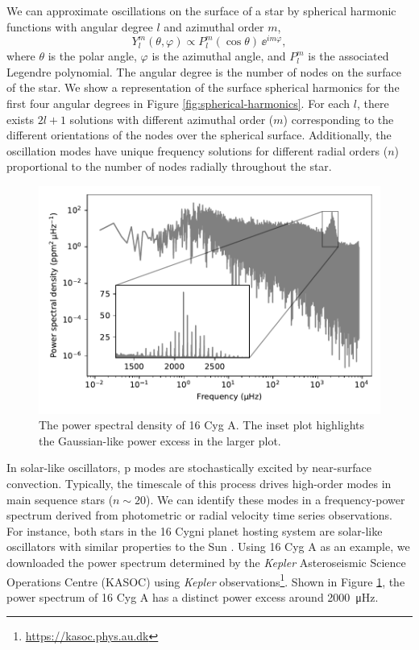 We can approximate oscillations on the surface of a star by spherical harmonic functions with angular degree \(l\) and azimuthal order \(m\),
%
\begin{equation}
    Y_l^m (\theta, \varphi) \propto P_l^m (\cos\theta) \, \ee^{im\varphi},
\end{equation} 
%
where \(\theta\) is the polar angle, \(\varphi\) is the azimuthal angle, and \(P_l^m\) is the associated Legendre polynomial. The angular degree is the number of nodes on the surface of the star. We show a representation of the surface spherical harmonics for the first four angular degrees in Figure \ref{fig:spherical-harmonics}. For each \(l\), there exists \(2l+1\) solutions with different azimuthal order (\(m\)) corresponding to the different orientations of the nodes over the spherical surface. Additionally, the oscillation modes have unique frequency solutions for different radial orders (\(n\)) proportional to the number of nodes radially throughout the star.

\begin{figure}[tb]
    \centering
    \includegraphics{figures/seismo-psd.pdf}
    \caption[The power spectral density of 16 Cyg A.]{The power spectral density of 16 Cyg A. The inset plot highlights the Gaussian-like power excess in the larger plot.}
    \label{fig:seismo-psd}
\end{figure}

In solar-like oscillators, p modes are stochastically excited by near-surface convection. Typically, the timescale of this process drives high-order modes in main sequence stars (\(n \sim 20\)). We can identify these modes in a frequency-power spectrum derived from photometric or radial velocity time series observations. For instance, both stars in the 16 Cygni planet hosting system are solar-like oscillators with similar properties to the Sun \citep{Metcalfe.Chaplin.ea2012,Davies.Chaplin.ea2015,Metcalfe.Creevey.ea2014}. Using 16 Cyg A as an example, we downloaded the power spectrum determined by the \emph{Kepler} Asteroseismic Science Operations Centre (KASOC) using \emph{Kepler} observations\footnote{\url{https://kasoc.phys.au.dk}}. Shown in Figure \ref{fig:seismo-psd}, the power spectrum of 16 Cyg A has a distinct power excess around \SI{2000}{\micro\hertz}. 

